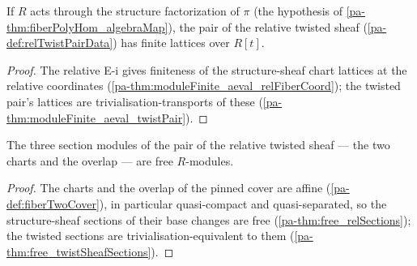 \begin{theorem}
  \label{pa-thm:moduleFinite_aeval_relTwistPair}
  \leanok

  If \(R\) acts through the structure factorization of \(\pi\) (the hypothesis of
  \ref{pa-thm:fiberPolyHom_algebraMap}), the pair of the relative twisted sheaf
  (\ref{pa-def:relTwistPairData}) has finite lattices over \(R[t]\).
\end{theorem}
\begin{proof}
  \leanok
  The relative E-i gives finiteness of the structure-sheaf chart lattices at the
  relative coordinates (\ref{pa-thm:moduleFinite_aeval_relFiberCoord}); the twisted pair's
  lattices are trivialisation-transports of these
  (\ref{pa-thm:moduleFinite_aeval_twistPair}).
\end{proof}

\begin{theorem}
  \label{pa-thm:free_relTwistSections}
  \leanok

  The three section modules of the pair of the relative twisted sheaf --- the two
  charts and the overlap --- are free \(R\)-modules.
\end{theorem}
\begin{proof}
  \leanok
  The charts and the overlap of the pinned cover are affine
  (\ref{pa-def:fiberTwoCover}), in particular quasi-compact and quasi-separated, so the
  structure-sheaf sections of their base changes are free
  (\ref{pa-thm:free_relSections}); the twisted sections are trivialisation-equivalent to
  them (\ref{pa-thm:free_twistSheafSections}).
\end{proof}

